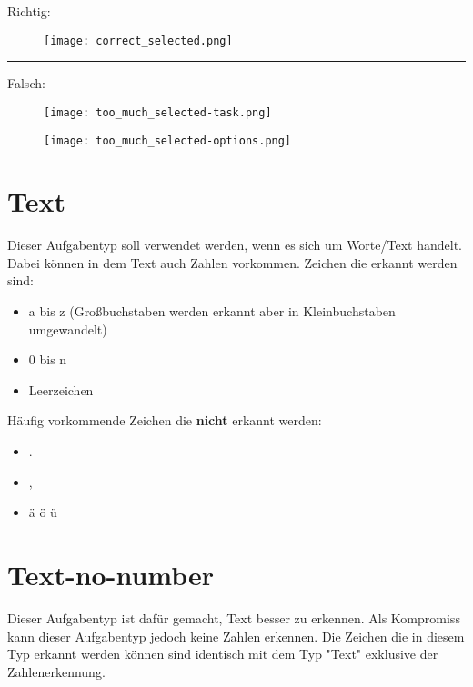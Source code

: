 Richtig:
\begin{figure}[H]
	\centering
\texttt{[image: correct\_selected.png]}
\end{figure}
\par\rule{\textwidth}{0.5pt}

Falsch:

\begin{figure}[H]
	\centering
\texttt{[image: too\_much\_selected-task.png]}
\end{figure}

\begin{figure}[H]
	\centering
\texttt{[image: too\_much\_selected-options.png]}
\end{figure}



\section{Text}

Dieser Aufgabentyp soll verwendet werden, wenn es sich um Worte/Text handelt.
Dabei k\"onnen in dem Text auch Zahlen vorkommen.
Zeichen die erkannt werden sind:

\begin{itemize}
	\item a bis z (Gro{\ss}buchstaben werden erkannt aber in Kleinbuchstaben umgewandelt)
	\item 0 bis n
	\item Leerzeichen
\end{itemize}

H\"aufig vorkommende Zeichen die \textbf{nicht} erkannt werden:

\begin{itemize}
	\item .
	\item ,
	\item \"a \"o \"u
\end{itemize}

\section{Text-no-number}

Dieser Aufgabentyp ist daf\"ur gemacht, Text besser zu erkennen.
Als Kompromiss kann dieser Aufgabentyp jedoch keine Zahlen erkennen.
Die Zeichen die in diesem Typ erkannt werden k\"onnen sind identisch mit dem Typ "Text" exklusive der Zahlenerkennung.

